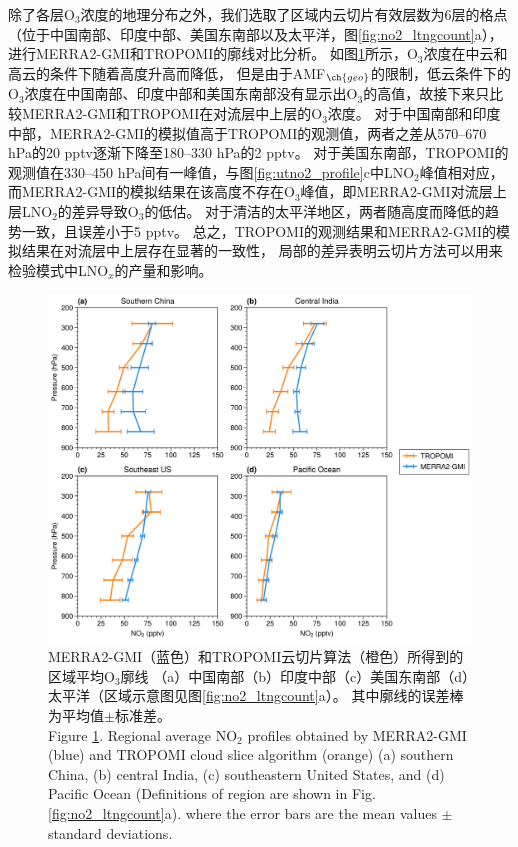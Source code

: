 除了各层O$_3$浓度的地理分布之外，我们选取了区域内云切片有效层数为6层的格点（位于中国南部、印度中部、美国东南部以及太平洋，图\ref{fig:no2_ltngcount}a），
进行MERRA2-GMI和TROPOMI的廓线对比分析。
如图\ref{fig:uto3_profile}所示，O$_3$浓度在中云和高云的条件下随着高度升高而降低，
但是由于AMF$_{\ch{geo}}$的限制，低云条件下的O$_3$浓度在中国南部、印度中部和美国东南部没有显示出O$_3$的高值，故接下来只比较MERRA2-GMI和TROPOMI在对流层中上层的O$_3$浓度。
对于中国南部和印度中部，MERRA2-GMI的模拟值高于TROPOMI的观测值，两者之差从570--670 hPa的20 pptv逐渐下降至180--330 hPa的2 pptv。
对于美国东南部，TROPOMI的观测值在330--450 hPa间有一峰值，与图\ref{fig:utno2_profile}c中LNO$_2$峰值相对应，
而MERRA2-GMI的模拟结果在该高度不存在O$_3$峰值，即MERRA2-GMI对流层上层LNO$_2$的差异导致O$_3$的低估。
对于清洁的太平洋地区，两者随高度而降低的趋势一致，且误差小于5 pptv。
总之，TROPOMI的观测结果和MERRA2-GMI的模拟结果在对流层中上层存在显著的一致性，
局部的差异表明云切片方法可以用来检验模式中LNO$_x$的产量和影响。



\begin{figure}[H]
    \centering
    \includegraphics[width=14cm]{./figures/uto3_profile.png}
    \caption{
    MERRA2-GMI（蓝色）和TROPOMI云切片算法（橙色）所得到的区域平均O$_3$廓线
    （a）中国南部（b）印度中部（c）美国东南部（d）太平洋（区域示意图见图\ref{fig:no2_ltngcount}a）。
    其中廓线的误差棒为平均值$\pm$标准差。\\
    Figure \ref{fig:uto3_profile}. Regional average NO$_2$ profiles obtained by MERRA2-GMI (blue) and TROPOMI cloud slice algorithm (orange)
    (a) southern China, (b) central India, (c) southeastern United States, and (d) Pacific Ocean
    (Definitions of region are shown in Fig. \ref{fig:no2_ltngcount}a).
    where the error bars are the mean values $\pm$ standard deviations.
    }
    \label{fig:uto3_profile}
\end{figure}

